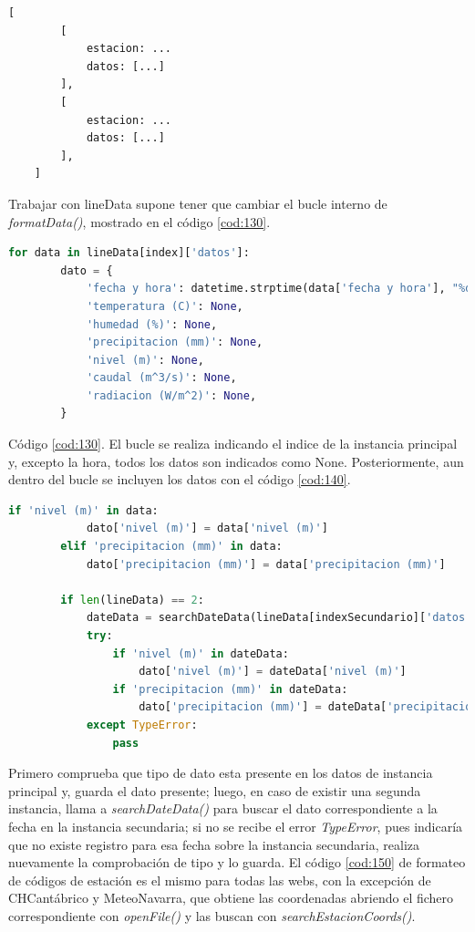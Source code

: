 \begin{lstlisting}[language=Python, caption={Formato del diccionario lineData en caso de disponer de dos instancias de una misma estación}, label=cod:120]
	[
		[
			estacion: ...
			datos: [...]
		],
		[
			estacion: ...
			datos: [...]
		],
	]
\end{lstlisting}

Trabajar con lineData supone tener que cambiar el bucle interno de \textit{formatData()}, mostrado en el código \ref{cod:130}.

\begin{lstlisting}[language=Python, caption={Modificación del bucle interno de \textit{formatData()}}, label=cod:130]
	for data in lineData[index]['datos']:
		dato = {
			'fecha y hora': datetime.strptime(data['fecha y hora'], "%d/%m/%Y %H:%M:%S").strftime("%Y-%m-%d %H:%M"),
			'temperatura (C)': None,
			'humedad (%)': None,
			'precipitacion (mm)': None,
			'nivel (m)': None,
			'caudal (m^3/s)': None,
			'radiacion (W/m^2)': None,
		}
\end{lstlisting}

Código \ref{cod:130}. El bucle se realiza indicando el indice de la instancia principal y, excepto la hora, todos los datos son indicados como None. Posteriormente, aun dentro del bucle se incluyen los datos con el código \ref{cod:140}.

\begin{lstlisting}[language=Python, caption={Inclusion de los datos en el objeto JSON dato}, label=cod:140]
		if 'nivel (m)' in data:
			dato['nivel (m)'] = data['nivel (m)']
		elif 'precipitacion (mm)' in data:
			dato['precipitacion (mm)'] = data['precipitacion (mm)']
		
		if len(lineData) == 2:
			dateData = searchDateData(lineData[indexSecundario]['datos'], data['fecha y hora'])
			try:
				if 'nivel (m)' in dateData:
					dato['nivel (m)'] = dateData['nivel (m)']
				if 'precipitacion (mm)' in dateData:
					dato['precipitacion (mm)'] = dateData['precipitacion (mm)']
			except TypeError:
				pass
\end{lstlisting}

Primero comprueba que tipo de dato esta presente en los datos de instancia principal y, guarda el dato presente; luego, en caso de existir una segunda instancia, llama a \textit{searchDateData()} para buscar el dato correspondiente a la fecha en la instancia secundaria; si no se recibe el error \textit{TypeError}, pues indicaría que no existe registro para esa fecha sobre la instancia secundaria, realiza nuevamente la comprobación de tipo y lo guarda.\newline
\newline
El código \ref{cod:150} de formateo de códigos de estación es el mismo para todas las webs, con la excepción de CHCantábrico y MeteoNavarra, que obtiene las coordenadas abriendo el fichero correspondiente con \textit{openFile()} y las buscan con \textit{searchEstacionCoords()}.

